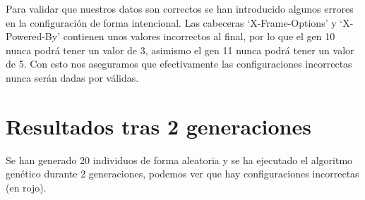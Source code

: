 \bigskip
Para validar que nuestros datos son correctos se han introducido algunos errores en la configuración de forma intencional. Las cabeceras `X-Frame-Options' y `X-Powered-By' contienen unos valores incorrectos al final, por lo que el gen 10 nunca podrá tener un valor de 3, asimismo el gen 11 nunca podrá tener un valor de 5. Con esto nos aseguramos que efectivamente las configuraciones incorrectas nunca serán dadas por válidas.

\section{Resultados tras 2 generaciones}

Se han generado 20 individuos de forma aleatoria y se ha ejecutado el algoritmo genético durante 2 generaciones, podemos ver que hay configuraciones incorrectas (en rojo).

